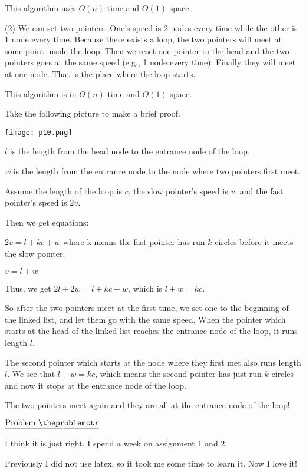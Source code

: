 \documentclass[11pt]{article}
\def\pp{\par\noindent}
\begin{document}
This algorithm uses $O(n)$ time and $O(1)$ space. 

\bigskip
\bigskip
\noindent
(2) We can set two pointers. One's speed is 2 nodes every time while the other is 1 node every time. Because there exists a loop, the two pointers will meet at some point inside the loop. Then we reset one pointer to the head and the two pointers goes at the same speed (e.g., 1 node every time). Finally they will meet at one node. That is the place where the loop starts.

This algorithm is in $O(n)$ time and $O(1)$ space.

Take the following picture to make a brief proof.


\texttt{[image: p10.png]}


$l$ is the length from the head node to the entrance node of the loop.

$w$ is the length from the entrance node to the node where two pointers first meet.

Assume the length of the loop is $c$, the slow pointer's speed is $v$, and the fast pointer's speed is $2v$.

Then we get equations:

$2v = l+kc+w$   where  k means the fast pointer has run $k$ circles before it meets the slow pointer.

$v = l+w$

Thus, we get $2l+2w = l+ kc+w$, which is $l+w=kc$.

So after the two pointers meet at the first time, we set one to the beginning of the linked list, and let them go with the same speed. When the pointer which starts at the head of the linked list reaches the entrance node of the loop, it runs length $l$.

The second pointer which starts at the node where they first met also runs length $l$. We see that $l+w=kc$, which means the second pointer has just run $k$ circles and now it stops at the entrance node of the loop.

The two pointers meet again and they are all at the entrance node of the loop!



\vfill
\newpage
\addtocounter{problemctr}{1}
\bigskip
\noindent
$\underline{\rm Problem\ \theproblemctr}$\pp
I think it is just right. I spend a week on assignment 1 and 2.

\noindent
Previously I did not use latex, so it took me some time to learn it. Now I love it!

  
\end{document}
